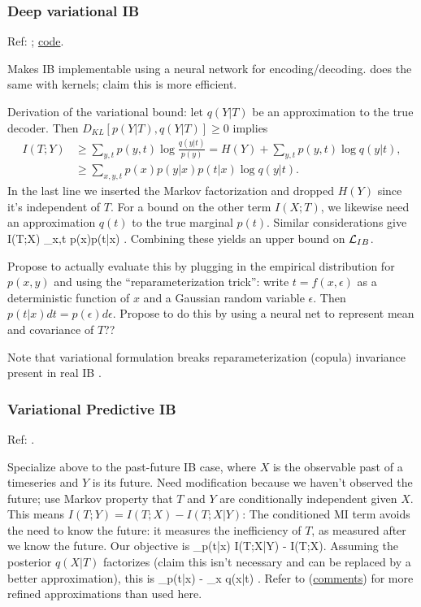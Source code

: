 \documentclass[notitlepage,openany,11pt]{report}
\numberwithin{equation}{section}
\theoremstyle{plain}%
\begin{document}
\subsubsection{Deep variational IB} 
Ref: \cite{AlemiEtAl:16}; \href{https://github.com/alexalemi/vib_demo}{code}.

Makes IB implementable using a neural network for encoding/decoding. \cite{ChalkEtAl:16} does the same with kernels; claim this is more efficient.

Derivation of the variational bound: let $q(Y|T)$ be an approximation to the true decoder. Then $D_{KL}[p(Y|T), q(Y|T)] \geq 0$ implies
\begin{align*}
I(T;Y) &\geq \sum_{y,t} p(y,t) \log \frac{q(y|t)}{p(y)} = H(Y) + \sum_{y,t} p(y,t) \log q(y|t), \\
{} &\geq \sum_{x,y,t} p(x)p(y|x) p(t|x) \log q(y|t).
\end{align*}
In the last line we inserted the Markov factorization and dropped $H(Y)$ since it's independent of $T$. For a bound on the other term $I(X;T)$, we likewise need an approximation $q(t)$ to the true marginal $p(t)$. Similar considerations give 
\be
I(T;X) \leq \sum_{x,t} p(x)p(t|x) \log {}.
\ee
Combining these yields an upper bound on $\mathcal{L}_{IB}$. 

Propose to actually evaluate this by plugging in the empirical distribution for $p(x,y)$  and using the ``reparameterization trick'': write $t=f(x,\epsilon)$ as a deterministic function of $x$ and a Gaussian random variable $\epsilon$. Then $p(t|x)dt = p(\epsilon)d\epsilon$. Propose to do this by using a neural net to represent mean and covariance of $T$??

Note that variational formulation breaks reparameterization (copula) invariance present in real IB \cite{WieczorekEtAl:18,WieczorekRoth:20}.


\subsubsection{Variational Predictive IB} 
Ref: \cite{Alemi:20}.

Specialize above to the past-future IB case, where $X$ is the observable past of a timeseries and $Y$ is its future. Need modification because we haven't observed the future; use Markov property that $T$ and $Y$ are conditionally independent given $X$. This means $I(T;Y) = I(T;X) - I(T; X|Y)$: The conditioned MI term avoids the need to know the future: it measures the inefficiency of $T$, as measured after we know the future. Our objective is
\be
\min_{p(t|x)} I(T;X|Y) - \beta I(T;X).
\ee
Assuming the posterior $q(X|T)$ factorizes (claim this isn't necessary and can be replaced by a better approximation), this is
\be
\min_{p(t|x)} \left\langle \log{} - \beta \sum_{x} \log q(x|t) \right\rangle.
\ee
Refer to \cite{AlemiFischer:18a} (\href{https://openreview.net/forum?id=HJeQToAqKQ}{comments}) for more refined approximations than used here.
\end{document}
